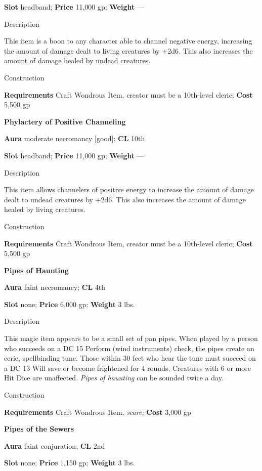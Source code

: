 \textbf{Slot }headband; \textbf{Price} 11,000 gp; \textbf{Weight} ---
				
Description
				
This item is a boon to any character able to channel negative energy, increasing the amount of damage dealt to living creatures by +2d6. This also increases the amount of damage healed by undead creatures.
				
Construction
				
\textbf{Requirements }Craft Wondrous Item, creator must be a 10th-level cleric; \textbf{Cost} 5,500 gp
				
\textbf{Phylactery of Positive Channeling}
				
\textbf{Aura} moderate necromancy \mbox{$[$}good\mbox{$]$}; \textbf{CL} 10th
				
\textbf{Slot }headband; \textbf{Price} 11,000 gp; \textbf{Weight} ---
				
Description
				
This item allows channelers of positive energy to increase the amount of damage dealt to undead creatures by +2d6. This also increases the amount of damage healed by living creatures.
				
Construction
				
\textbf{Requirements }Craft Wondrous Item, creator must be a 10th-level cleric; \textbf{Cost} 5,500 gp
				
\textbf{Pipes of Haunting}
				
\textbf{Aura} faint necromancy;\textbf{ CL }4th
				
\textbf{Slot} none; \textbf{Price} 6,000 gp; \textbf{Weight} 3 lbs.
				
Description
				
This magic item appears to be a small set of pan pipes. When played by a person who succeeds on a DC 15 Perform (wind instruments) check, the pipes create an eerie, spellbinding tune. Those within 30 feet who hear the tune must succeed on a DC 13 Will save or become frightened for 4 rounds. Creatures with 6 or more Hit Dice are unaffected. \textit{Pipes of haunting} can be sounded twice a day. 
				
Construction
				
\textbf{Requirements} Craft Wondrous Item,\textit{ scare;}\textbf{ Cost }3,000 gp
				
\textbf{Pipes of the Sewers}
				
\textbf{Aura} faint conjuration;\textbf{ CL }2nd
				
\textbf{Slot} none; \textbf{Price} 1,150 gp; \textbf{Weight} 3 lbs.
				
